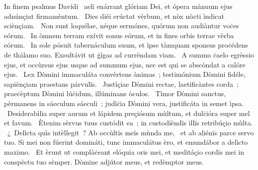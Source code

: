 { In finem psalmus Davídi}
{%
~aeli enárrant glóriam Dei, et ópera mànuum ejus adnúnçiat firmamèntum. 
~Dies diéi erúctat vèrbum, et nòx nòcti ìndicat sciènçiam. 
~Non sunt loquélae, néque sermónes, quórum non audiàntur voċes eórum. 
~In òmnem terram exívit sonus eórum, et in fines orbis terrae vèrba eórum. 
~In sole pósuit tabernáculum suum, et ìpse tàmquam sponsus proċédens de thàlamo suo. Exsultávit ut ġìgas ad currèndam viam. 
~A summo ċaelo egrèssio ejus, et occùrsus ejus usque ad summum ejus, nec est qui se abscòndat a calóre ejus. 
~Lex Dòmini immaculáta convèrtens ànimas~; testimónium Dòmini fidéle, sapiènçiam praestans párvulïs. 
~Justìçiae Dòmini rectae, laetificàntes corda~; praeċèptum Dòmini lúċidum, illúminans òculos. 
~Tìmor Dòmini sanctus, pèrmanens in sáeculum sáeculi~; judìċia Dòmini vera, justificáta in semet ìpsa. 
~Desiderabìlia super aurum et lápidem preçiósum mùltum, et dulċióra super mel et favum. 
~Ètenim sèrvus tuus custódit ea~; in custodièndïs illïs retribúçio mùlta. 
~¿~Delìcta quìs intèllegit~? Ab occùltïs meïs mùnda me, 
~et ab aliénïs parce servo tuo. Si mei non fúerint domináti, tunc immaculátus èro, et emundábor a delìcto maximo. 
~Et èrunt ut complàċeant elóquia oris mei, et meditáçio cordis mei in conspèctu tuo sèmper. Dòmine adjútor meus, et redèmptor meus. 
}
